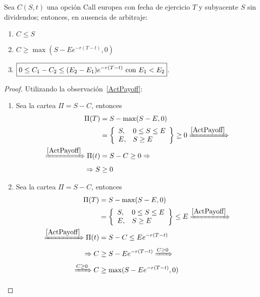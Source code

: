 \begin{proposition}\label{PropsCall}
    Sea $C(S,t)$ una opción Call europea con fecha de ejercicio $T$ y subyacente $S$ sin dividendos; entonces, en ausencia de arbitraje:
    \begin{enumerate}
        \item $\boxed{C \leq S}$
        \item $\boxed{C \geq \max(S-Ee^{-r(T-t)}, 0)}$
        \item $\boxed{0 \leq C_1 -C_2 \leq (E_2-E_1)e^{-r(T-t)}$ con $E_1<E_2}$.
    \end{enumerate}
\end{proposition}
\begin{proof}
    Utilizando la observación~\ref{ActPayoff}:
    \begin{enumerate}
        \item Sea la cartea $\Pi = S-C$, entonces
        \begin{align*}
            \Pi(T) &= S - \max(S - E,0) \\
            &= \left\{
            \begin{array}{ll}
              S,       & 0 \leq S \leq E \\
              E,        & S \geq E
            \end{array}
            \right\} \geq 0 \xRightarrow{\ref{ActPayoff}} \\
            \xRightarrow{\ref{ActPayoff}} \Pi(t) &= S-C \geq 0 \Rightarrow \\
            \Rightarrow S &\geq 0
        \end{align*}
        \item Sea la cartea $\Pi = S-C$, entonces
        \begin{align*}
            \Pi(T) &= S - \max(S - E,0) \\
            &= \left\{
            \begin{array}{ll}
              S,       & 0 \leq S \leq E \\
              E,        & S \geq E
            \end{array}
            \right\} \leq E \xRightarrow{\ref{ActPayoff}}\\
            \xRightarrow{\ref{ActPayoff}} \Pi(t) &= S - C \leq Ee^{-r(T-t)} \\
            \Rightarrow C &\geq  S - Ee^{-r(T-t)} \xRightarrow{C \geq 0} \\
            \xRightarrow{C \geq 0} C &\geq \max(S - Ee^{-r(T-t)}, 0)
        \end{align*}

\end{enumerate}
\end{proof}
